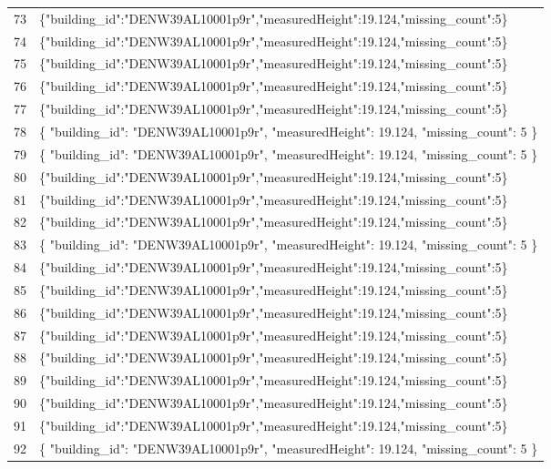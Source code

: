 \documentclass[a4paper,11pt]{article}
\begin{document}
\begin{table}[ht]
\begin{tabular}{r p{12cm}}
73 & \{"building\_id":"DENW39AL10001p9r","measuredHeight":19.124,"missing\_count":5\} \\
74 & \{"building\_id":"DENW39AL10001p9r","measuredHeight":19.124,"missing\_count":5\} \\
75 & \{"building\_id":"DENW39AL10001p9r","measuredHeight":19.124,"missing\_count":5\} \\
76 & \{"building\_id":"DENW39AL10001p9r","measuredHeight":19.124,"missing\_count":5\} \\
77 & \{"building\_id":"DENW39AL10001p9r","measuredHeight":19.124,"missing\_count":5\} \\
78 & \{
  "building\_id": "DENW39AL10001p9r",
  "measuredHeight": 19.124,
  "missing\_count": 5
\} \\
79 & \{
  "building\_id": "DENW39AL10001p9r",
  "measuredHeight": 19.124,
  "missing\_count": 5
\} \\
80 & \{"building\_id":"DENW39AL10001p9r","measuredHeight":19.124,"missing\_count":5\} \\
81 & \{"building\_id":"DENW39AL10001p9r","measuredHeight":19.124,"missing\_count":5\} \\
82 & \{"building\_id":"DENW39AL10001p9r","measuredHeight":19.124,"missing\_count":5\} \\
83 & \{
  "building\_id": "DENW39AL10001p9r",
  "measuredHeight": 19.124,
  "missing\_count": 5
\} \\
84 & \{"building\_id":"DENW39AL10001p9r","measuredHeight":19.124,"missing\_count":5\} \\
85 & \{"building\_id":"DENW39AL10001p9r","measuredHeight":19.124,"missing\_count":5\} \\
86 & \{"building\_id":"DENW39AL10001p9r","measuredHeight":19.124,"missing\_count":5\} \\
87 & \{"building\_id":"DENW39AL10001p9r","measuredHeight":19.124,"missing\_count":5\} \\
88 & \{"building\_id":"DENW39AL10001p9r","measuredHeight":19.124,"missing\_count":5\} \\
89 & \{"building\_id":"DENW39AL10001p9r","measuredHeight":19.124,"missing\_count":5\} \\
90 & \{"building\_id":"DENW39AL10001p9r","measuredHeight":19.124,"missing\_count":5\} \\
91 & \{"building\_id":"DENW39AL10001p9r","measuredHeight":19.124,"missing\_count":5\} \\
92 & \{
  "building\_id": "DENW39AL10001p9r",
  "measuredHeight": 19.124,
  "missing\_count": 5
\} \\

\end{tabular}
\end{table}
\end{document}
